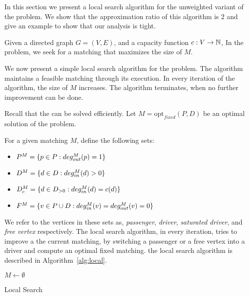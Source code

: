 \label{sub:uwcm}
In this section we present a local search algorithm for the unweighted
variant of the problem.
We show that the approximation ratio of this algorithm is $2$ and give an example
to show that our analysis is tight.

Given a directed graph $G = (V, E)$, 
and a capacity function ${c : V \rightarrow \mathbb{N}}$, 
In the \textsc{\UWCARPOOL{}} problem, 
we seek for a matching that maximizes the size of $M$.

We now present a simple local search algorithm for the problem. 
The algorithm maintains a feasible matching through its execution.
In every iteration of the algorithm, the size of $M$ increases.
The algorithm terminates, when no further improvement can be done. 

Recall that the \FIXEDCARPOOL{} can be solved efficiently.
Let $M = \text{opt}_{fixed}(P, D)$ be an optimal solution of the
\FIXEDCARPOOL{} problem.
%

For a given matching $M$, define the following sets:
\begin{itemize}
\item $P^M = \{p \in P : deg^M_{out}(p) = 1\}$
\item $D^M = \{d \in D : deg^M_{in}(d) > 0\}$
\item $D^M_c = \{d \in D_{>0} : deg^M_{in}(d) = c(d)\}$
\item $F^M = \{v \in P \cup D : deg^M_{in}(v) = deg^M_{out}(v) = 0\}$ 
\end{itemize}
We refer to the vertices in these sets as, \emph{passenger}, 
\emph{driver}, \emph{saturated driver}, and \emph{free vertex} respectively.
The local search algorithm, in every iteration, 
tries to improve a the current matching, 
by switching a passenger or a free vertex into a driver 
and compute an optimal fixed matching.
the local search algorithm is described in
Algorithm~\ref{alg:local}.

\begin{algorithm}
$M \leftarrow \emptyset$					\\

\caption{
\label{alg:local}
Local Search}
\end{algorithm}

